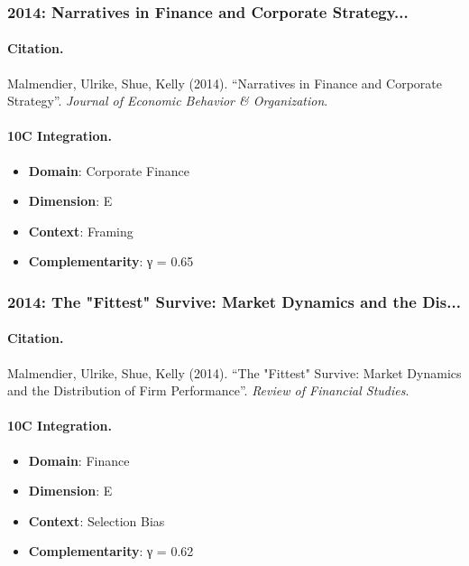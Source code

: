 \subsubsection{2014: Narratives in Finance and Corporate Strategy...}

\paragraph{Citation.}
Malmendier, Ulrike, Shue, Kelly (2014). ``Narratives in Finance and Corporate Strategy''. \textit{Journal of Economic Behavior & Organization}.

\paragraph{10C Integration.}
\begin{itemize}[nosep]
  \item \textbf{Domain}: Corporate Finance
  \item \textbf{Dimension}: E
  \item \textbf{Context}: Framing
  \item \textbf{Complementarity}: γ = 0.65
\end{itemize}


\subsubsection{2014: The "Fittest" Survive: Market Dynamics and the Dis...}

\paragraph{Citation.}
Malmendier, Ulrike, Shue, Kelly (2014). ``The "Fittest" Survive: Market Dynamics and the Distribution of Firm Performance''. \textit{Review of Financial Studies}.

\paragraph{10C Integration.}
\begin{itemize}[nosep]
  \item \textbf{Domain}: Finance
  \item \textbf{Dimension}: E
  \item \textbf{Context}: Selection Bias
  \item \textbf{Complementarity}: γ = 0.62
\end{itemize}


